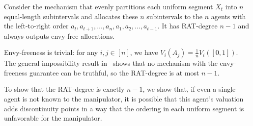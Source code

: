 \begin{theoremrep}
    Consider the mechanism that evenly partitions each uniform segment $X_t$ into $n$ equal-length subintervals and allocates these $n$ subintervals to the $n$ agents with the left-to-right order $a_t,a_{t+1},\ldots,a_n,a_1,a_2,\ldots,a_{t-1}$. It has RAT-degree $n-1$ and always outputs envy-free allocations.
\end{theoremrep}
\begin{proofsketch}
    Envy-freeness is trivial: for any $i,j\in[n]$, we have $V_i(A_j)=\frac1nV_i([0,1])$.
    The general impossibility result in~\citet{tao2022existence} shows that no mechanism with the envy-freeness guarantee can be truthful, so the RAT-degree is at most $n-1$.

 To show that the RAT-degree is exactly $n-1$, we show that, if even a single agent is not known to the manipulator, it is possible that this agent's valuation adds discontinuity points in a way that the ordering in each uniform segment is unfavorable for the manipulator.
\end{proofsketch}
